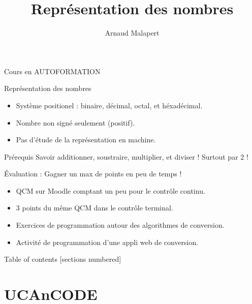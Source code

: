 \documentclass[10pt]{beamer}
\title{Représentation des nombres}
\author{Arnaud Malapert}
\begin{document}
\maketitle


\begin{frame}{Cours en AUTOFORMATION}
  
  \begin{block}{Représentation des nombres}
    \begin{itemize}
    \item Système positionel : binaire, décimal, octal, et héxadécimal.
    \item Nombre non signé seulement (positif).
    \item Pas d'étude de la représentation en machine.
    \end{itemize}
  \end{block}

  \begin{block}{Prérequis}
    Savoir additionner, soustraire, multiplier, et diviser ! Surtout par 2 !
  \end{block}

  \begin{alertblock}{Évaluation : Gagner un max de points en peu de temps !
}
    \begin{itemize}
    \item QCM sur Moodle comptant un peu pour le contrôle continu. 
    \item 3 points du même QCM dans le contrôle terminal.
    \item Exercices de programmation autour des algorithmes de conversion.
    \item Activité de programmation d'une appli web de conversion.
    \end{itemize}
  \end{alertblock}

\end{frame}


\begin{frame}{Table of contents}
  [sections numbered]
  \tableofcontents
\end{frame}


\section{UCAnCODE}
\end{document}
